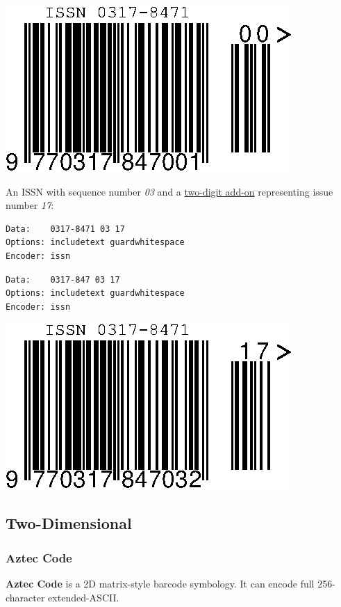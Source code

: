 \includegraphics{images/issn-1.eps}

An ISSN with sequence number \emph{03} and a
\protect\hyperlink{ean-2}{two-digit add-on} representing issue number
\emph{17}:

\begin{verbatim}
Data:    0317-8471 03 17
Options: includetext guardwhitespace
Encoder: issn
\end{verbatim}

\begin{verbatim}
Data:    0317-847 03 17
Options: includetext guardwhitespace
Encoder: issn
\end{verbatim}

\includegraphics{images/issn-2.eps}

\hypertarget{two-dimensional}{%
\subsection{Two-Dimensional}\label{two-dimensional}}

\hypertarget{aztec-code}{%
\subsubsection{Aztec Code}\label{aztec-code}}

\textbf{Aztec Code} is a 2D matrix-style barcode symbology. It can
encode full 256-character extended-ASCII.

